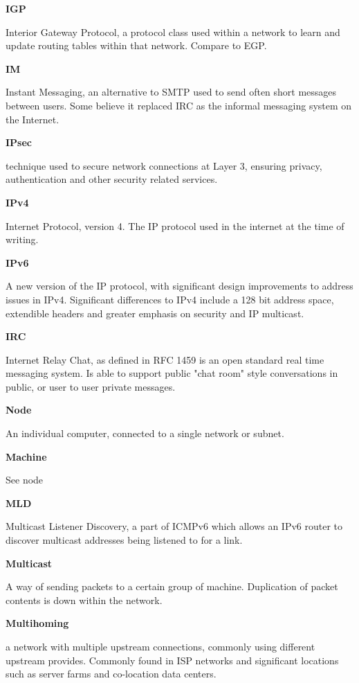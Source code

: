 \textbf{IGP}

Interior Gateway Protocol, a protocol class used within a network to
learn and update routing tables within that network. Compare to EGP.

\textbf{IM}

Instant Messaging, an alternative to SMTP used to send often short
messages between users. Some believe it replaced IRC as the informal
messaging system on the Internet. 

\textbf{IPsec}

technique used to secure network connections at Layer 3, ensuring
privacy, authentication and other security related services. 

\textbf{IPv4}

Internet Protocol, version 4. The IP protocol used in the internet
at the time of writing.

\textbf{IPv6}

A new version of the IP protocol, with significant design improvements
to address issues in IPv4. Significant differences to IPv4 include a
128 bit address space, extendible headers and greater emphasis on 
security and IP multicast.

\textbf{IRC}

Internet Relay Chat, as defined in RFC 1459 is an open standard real
time messaging system. Is able to support public "chat room" style
conversations in public, or user to user private messages.

\textbf{Node}

An individual computer, connected to a single network or subnet.

\textbf{Machine}

See node

\textbf{MLD}

Multicast Listener Discovery, a part of ICMPv6 which allows an IPv6
router to discover multicast addresses being listened to for a link.

\textbf{Multicast}

A way of sending packets to a certain group of machine. Duplication of
packet contents is down within the network.

\textbf{Multihoming}

a network with multiple upstream connections, commonly using different
upstream provides. Commonly found in ISP networks and significant
locations such as server farms and co-location data centers.

